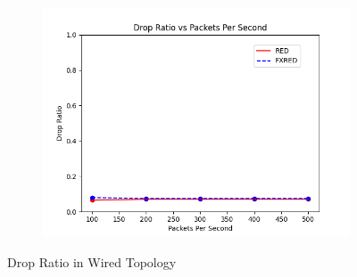 \documentclass[10pt]{report}
\begin{document}
\begin{figure}
    \begin{subfigure}{.5\textwidth}
        \includegraphics[width=1\linewidth]{static/graphs/wired/Drop Ratio vs Packets Per Second.png}
    \end{subfigure}
    \caption{Drop Ratio in Wired Topology}
    \label{fig:wired_drp_ratio}
\end{figure}
\end{document}
